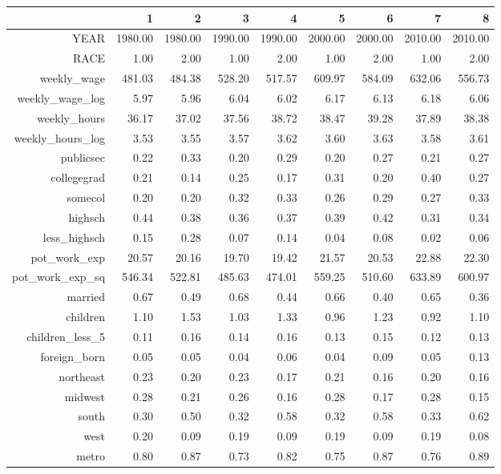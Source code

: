 \begin{table}[ht]
\centering
\begin{tabular}{rrrrrrrrr}
  \hline
 & 1 & 2 & 3 & 4 & 5 & 6 & 7 & 8 \\ 
  \hline
YEAR & 1980.00 & 1980.00 & 1990.00 & 1990.00 & 2000.00 & 2000.00 & 2010.00 & 2010.00 \\ 
  RACE & 1.00 & 2.00 & 1.00 & 2.00 & 1.00 & 2.00 & 1.00 & 2.00 \\ 
  weekly\_wage & 481.03 & 484.38 & 528.20 & 517.57 & 609.97 & 584.09 & 632.06 & 556.73 \\ 
  weekly\_wage\_log & 5.97 & 5.96 & 6.04 & 6.02 & 6.17 & 6.13 & 6.18 & 6.06 \\ 
  weekly\_hours & 36.17 & 37.02 & 37.56 & 38.72 & 38.47 & 39.28 & 37.89 & 38.38 \\ 
  weekly\_hours\_log & 3.53 & 3.55 & 3.57 & 3.62 & 3.60 & 3.63 & 3.58 & 3.61 \\ 
  publicsec & 0.22 & 0.33 & 0.20 & 0.29 & 0.20 & 0.27 & 0.21 & 0.27 \\ 
  collegegrad & 0.21 & 0.14 & 0.25 & 0.17 & 0.31 & 0.20 & 0.40 & 0.27 \\ 
  somecol & 0.20 & 0.20 & 0.32 & 0.33 & 0.26 & 0.29 & 0.27 & 0.33 \\ 
  highsch & 0.44 & 0.38 & 0.36 & 0.37 & 0.39 & 0.42 & 0.31 & 0.34 \\ 
  less\_highsch & 0.15 & 0.28 & 0.07 & 0.14 & 0.04 & 0.08 & 0.02 & 0.06 \\ 
  pot\_work\_exp & 20.57 & 20.16 & 19.70 & 19.42 & 21.57 & 20.53 & 22.88 & 22.30 \\ 
  pot\_work\_exp\_sq & 546.34 & 522.81 & 485.63 & 474.01 & 559.25 & 510.60 & 633.89 & 600.97 \\ 
  married & 0.67 & 0.49 & 0.68 & 0.44 & 0.66 & 0.40 & 0.65 & 0.36 \\ 
  children & 1.10 & 1.53 & 1.03 & 1.33 & 0.96 & 1.23 & 0.92 & 1.10 \\ 
  children\_less\_5 & 0.11 & 0.16 & 0.14 & 0.16 & 0.13 & 0.15 & 0.12 & 0.13 \\ 
  foreign\_born & 0.05 & 0.05 & 0.04 & 0.06 & 0.04 & 0.09 & 0.05 & 0.13 \\ 
  northeast & 0.23 & 0.20 & 0.23 & 0.17 & 0.21 & 0.16 & 0.20 & 0.16 \\ 
  midwest & 0.28 & 0.21 & 0.26 & 0.16 & 0.28 & 0.17 & 0.28 & 0.15 \\ 
  south & 0.30 & 0.50 & 0.32 & 0.58 & 0.32 & 0.58 & 0.33 & 0.62 \\ 
  west & 0.20 & 0.09 & 0.19 & 0.09 & 0.19 & 0.09 & 0.19 & 0.08 \\ 
  metro & 0.80 & 0.87 & 0.73 & 0.82 & 0.75 & 0.87 & 0.76 & 0.89 \\ 
   \hline
\end{tabular}
\end{table}
